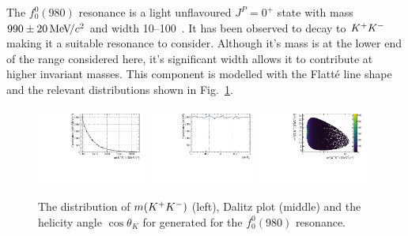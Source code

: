 The $f_{0}^{0}(980)$ resonance is a light unflavoured $J^{P} = 0^{+}$ state with mass $990\pm20{\mathrm{\,Me\kern -0.1em V\!/}c^2}$ and width 10--100\mevcc~\cite{PDG2016}. It has been observed to decay to ${{K}^+}{{K}^-}$ making it a suitable resonance to consider. Although it's mass is at the lower end of the range considered here, it's significant width allows it to contribute at higher invariant masses. This component is modelled with the Flatt\'{e} line shape~\cite{FLATTE1976224} and the relevant distributions shown in Fig.~\ref{fig:DsKK_model_f0980}.
\begin{figure}[!h]
   \centering   
   \includegraphics[width=0.32\textwidth]{figs/B2DsPhi/f0_phi_mass.pdf}
   \includegraphics[width=0.32\textwidth]{figs/B2DsPhi/f0_Helicity.pdf}
   \includegraphics[width=0.32\textwidth]{figs/B2DsPhi/f0_Dalitz_plot.pdf}
   \caption{The distribution of $m({{K}^+}{{K}^-})$ (left), Dalitz plot (middle) and the helicity angle $\cos\theta_{K}$ for generated for the $f_{0}^{0}(980)$ resonance.} 
   \label{fig:DsKK_model_f0980}   
\end{figure}

